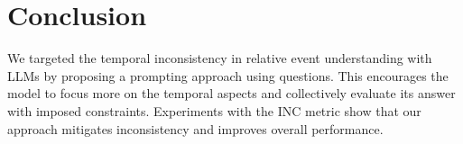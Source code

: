 \section{Conclusion}


We targeted the temporal inconsistency in relative event understanding with LLMs by proposing a prompting approach using \contrast questions.
This encourages the model to focus more on the temporal aspects and collectively evaluate its answer with imposed constraints.
Experiments with the INC metric show that our approach mitigates inconsistency and improves overall performance.




